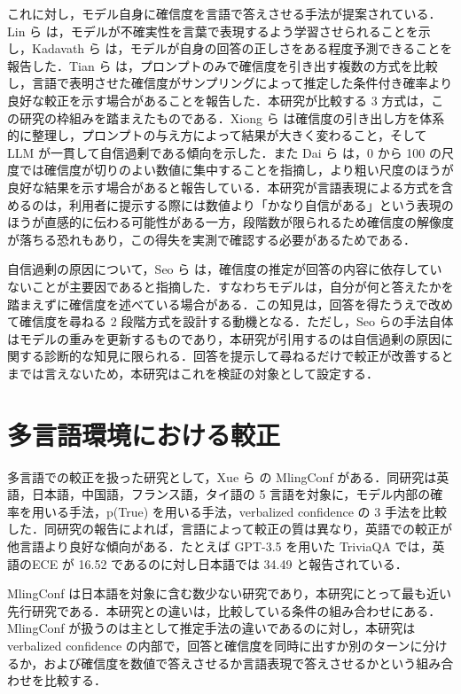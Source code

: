 これに対し，モデル自身に確信度を言語で答えさせる手法が提案されている．Lin ら \cite{lin2022teaching} は，モデルが不確実性を言葉で表現するよう学習させられることを示し，Kadavath ら \cite{kadavath2022know} は，モデルが自身の回答の正しさをある程度予測できることを報告した．Tian ら \cite{tian2023justask} は，プロンプトのみで確信度を引き出す複数の方式を比較し，言語で表明させた確信度がサンプリングによって推定した条件付き確率より良好な較正を示す場合があることを報告した．本研究が比較する 3 方式は，この研究の枠組みを踏まえたものである．Xiong ら \cite{xiong2024llmuncertainty} は確信度の引き出し方を体系的に整理し，プロンプトの与え方によって結果が大きく変わること，そして LLM が一貫して自信過剰である傾向を示した．また Dai ら \cite{dai2026rescaling} は，0 から 100 の尺度では確信度が切りのよい数値に集中することを指摘し，より粗い尺度のほうが良好な結果を示す場合があると報告している．本研究が言語表現による方式を含めるのは，利用者に提示する際には数値より「かなり自信がある」という表現のほうが直感的に伝わる可能性がある一方，段階数が限られるため確信度の解像度が落ちる恐れもあり，この得失を実測で確認する必要があるためである．

自信過剰の原因について，Seo ら \cite{seo2025advice} は，確信度の推定が回答の内容に依存していないことが主要因であると指摘した．すなわちモデルは，自分が何と答えたかを踏まえずに確信度を述べている場合がある．この知見は，回答を得たうえで改めて確信度を尋ねる 2 段階方式を設計する動機となる．ただし，Seo らの手法自体はモデルの重みを更新するものであり，本研究が引用するのは自信過剰の原因に関する診断的な知見に限られる．回答を提示して尋ねるだけで較正が改善するとまでは言えないため，本研究はこれを検証の対象として設定する．

\section{多言語環境における較正}

多言語での較正を扱った研究として，Xue ら \cite{xue2025mlingconf} の MlingConf がある．同研究は英語，日本語，中国語，フランス語，タイ語の 5 言語を対象に，モデル内部の確率を用いる手法，p(True) を用いる手法，verbalized confidence の 3 手法を比較した．同研究の報告によれば，言語によって較正の質は異なり，英語での較正が他言語より良好な傾向がある．たとえば GPT-3.5 を用いた TriviaQA では，英語のECE が 16.52 であるのに対し日本語では 34.49 と報告されている．

MlingConf は日本語を対象に含む数少ない研究であり，本研究にとって最も近い先行研究である．本研究との違いは，比較している条件の組み合わせにある．MlingConf が扱うのは主として推定手法の違いであるのに対し，本研究は verbalized confidence の内部で，回答と確信度を同時に出すか別のターンに分けるか，および確信度を数値で答えさせるか言語表現で答えさせるかという組み合わせを比較する．

